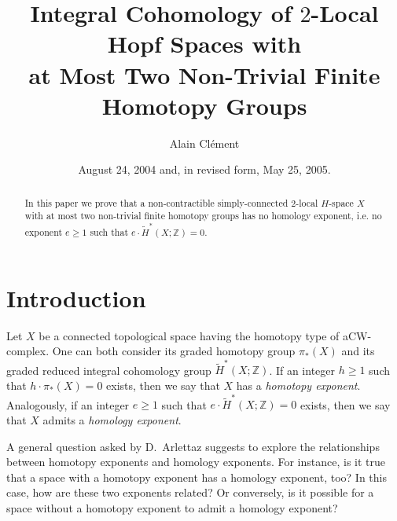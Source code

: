 \documentclass{conm-p-l}
\theoremstyle{definition}
\newcommand{\Z}{\mathbb{Z}}
\renewcommand{\geq}{\geqslant}
\begin{document}
\title[Int. Coh. of $2$-Loc. $H$-Spaces with Two Non-Triv. Finite Homotopy Gr.]{Integral Cohomology of $2$-Local Hopf Spaces with\\ at Most Two Non-Trivial Finite Homotopy Groups}

\author{Alain Cl\'ement}
\address{Institute of Mathematics, Faculty of Sciences, University of Lausanne}


\date{August 24, 2004 and, in revised form, May 25, 2005.}


\begin{abstract}
In this paper we prove that a non-contractible simply-connected $2$-local ${H}$-space $X$ with at most two non-trivial finite homotopy groups has no homology exponent, i.e. no exponent $e\geq1$ such that $e\cdot\widetilde{H}^*(X;\Z)=0$.
\end{abstract}

\maketitle

\section{Introduction}

Let $X$ be a connected topological space having the homotopy type of a\break CW-complex. One can both consider its graded homotopy group $\pi_*(X)$ and its graded reduced integral cohomology group $\widetilde{H}^*(X;\Z)$. If an integer $h\geq1$ such that $h\cdot\pi_*(X)=0$ exists, then we say that $X$ has a {\it homotopy exponent}. Analogously, if an integer $e\geq1$ such that $e\cdot \widetilde{H}^*(X;\Z)=0$ exists, then we say that $X$ admits a {\it homology exponent}.

A general question asked by D.~Arlettaz suggests to explore the relationships between homotopy exponents and homology exponents. For instance, is it true that a space with a homotopy exponent has a homology exponent, too? In this case, how are these two exponents related? Or conversely, is it possible for a space without a homotopy exponent to admit a homology exponent?
\end{document}
